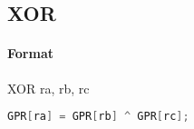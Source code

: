 \subsection{XOR}


\paragraph{Format} XOR ra, rb, rc

\begin{lstlisting}[language=C]
    GPR[ra] = GPR[rb] ^ GPR[rc];
\end{lstlisting}